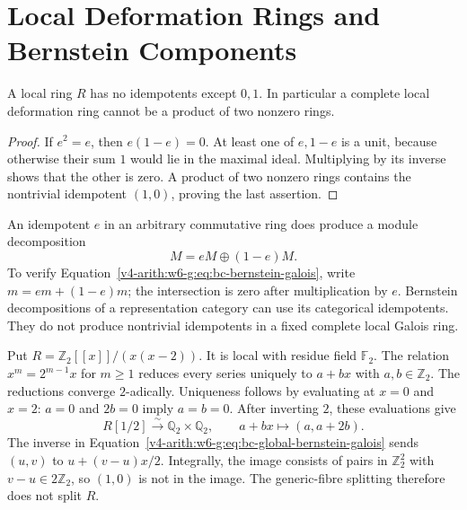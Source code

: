 \section{Local Deformation Rings and Bernstein Components}
\label{v4-arith:w6-g:bcglue-final}

\begin{proposition}
\label{v4-arith:w6-g:thm:bc-bernstein-galois}
A local ring $R$ has no idempotents except $0,1$.
In particular a complete local deformation ring cannot be a product
of two nonzero rings.
\end{proposition}

\begin{proof}
If $e^2=e$, then $e(1-e)=0$.
At least one of $e,1-e$ is a unit, because otherwise their sum $1$
would lie in the maximal ideal. Multiplying by its inverse shows
that the other is zero. A product of two nonzero rings contains
the nontrivial idempotent $(1,0)$, proving the last assertion.
\end{proof}

An idempotent $e$ in an arbitrary commutative ring does produce
a module decomposition
\begin{equation}
\label{v4-arith:w6-g:eq:bc-bernstein-galois}
 M=eM\oplus(1-e)M.
\end{equation}
To verify Equation~\eqref{v4-arith:w6-g:eq:bc-bernstein-galois},
write $m=em+(1-e)m$; the intersection is zero after
multiplication by $e$. Bernstein decompositions of a representation
category can use its categorical idempotents. They do not produce
nontrivial idempotents in a fixed complete local Galois ring.

\begin{example}
\label{v4-arith:w6-g:ex:generic-fibre-split}
Put $R=\mathbb Z_2[[x]]/(x(x-2))$.
It is local with residue field $\mathbb F_2$.
The relation $x^m=2^{m-1}x$ for $m\ge1$ reduces every series
uniquely to $a+bx$ with $a,b\in\mathbb Z_2$.
The reductions converge $2$-adically.
Uniqueness follows by evaluating at $x=0$ and $x=2$:
$a=0$ and $2b=0$ imply $a=b=0$.
After inverting $2$, these evaluations give
\begin{equation}
\label{v4-arith:w6-g:eq:bc-global-bernstein-galois}
 R[1/2]\xrightarrow{\sim}\mathbb Q_2\times\mathbb Q_2,
 \qquad a+bx\longmapsto(a,a+2b).
\end{equation}
The inverse in Equation~\eqref{v4-arith:w6-g:eq:bc-global-bernstein-galois}
sends $(u,v)$ to $u+(v-u)x/2$.
Integrally, the image consists of pairs in $\mathbb Z_2^2$ with
$v-u\in2\mathbb Z_2$, so $(1,0)$ is not in the image.
The generic-fibre splitting therefore does not split $R$.
\end{example}

